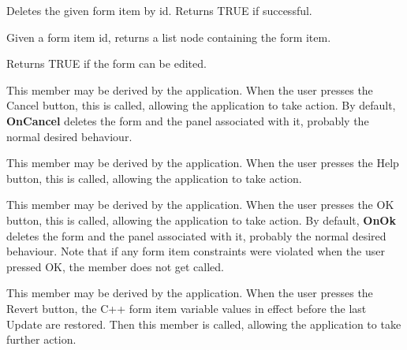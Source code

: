 

Deletes the given form item by id. Returns TRUE if successful.



Given a form item id, returns a list node containing the form item.



Returns TRUE if the form can be edited.



This member may be derived by the application. When the user presses the
Cancel button, this is called, allowing the application to take action.
By default, {\bf OnCancel} deletes the form and the panel associated with
it, probably the normal desired behaviour.



This member may be derived by the application. When the user presses the
Help button, this is called, allowing the application to take action.



This member may be derived by the application. When the user presses the
OK button, this is called, allowing the application to take action.
By default, {\bf OnOk} deletes the form and the panel associated with
it, probably the normal desired behaviour. Note that if any form item
constraints were violated when the user pressed OK, the member does not
get called.



This member may be derived by the application. When the user presses the
Revert button, the C++ form item variable values in effect before the
last Update are restored.  Then this member is called, allowing the
application to take further action.



